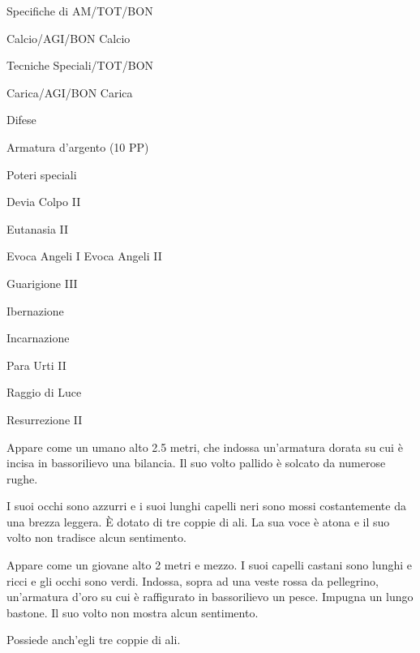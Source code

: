 \begin{parmostro}{Specifiche di AM/TOT/BON}
\item Calcio/AGI/BON Calcio
\end{parmostro}

\begin{parmostro}{Tecniche Speciali/TOT/BON}
\item Carica/AGI/BON Carica
\end{parmostro}

\begin{parmostro}{Difese}
\item Armatura d'argento (10 PP)
\end{parmostro}

\begin{parmostro}{Poteri speciali}
\item Devia Colpo II
\item Eutanasia II
\item Evoca Angeli I Evoca Angeli II
\item Guarigione III
\item Ibernazione
\item Incarnazione
\item Para Urti II
\item Raggio di Luce
\item Resurrezione II
\end{parmostro}


Appare come un umano alto 2.5 metri, che indossa un'armatura dorata
su cui \`e incisa in bassorilievo una bilancia. Il suo volto pallido \`e
solcato da numerose rughe. 

I suoi occhi sono azzurri e i suoi lunghi capelli
neri sono mossi costantemente da una brezza leggera. \`E dotato di tre coppie
di ali. La sua voce \`e atona e il suo volto non tradisce alcun sentimento.


Appare come un giovane alto 2 metri e mezzo. I suoi capelli castani
sono lunghi e ricci e gli occhi sono verdi. Indossa, sopra ad una
veste rossa da pellegrino, un'armatura d'oro su cui \`e
raffigurato in bassorilievo un pesce. Impugna un lungo bastone.  Il
suo volto non mostra alcun sentimento. 

Possiede anch'egli tre coppie di ali.


